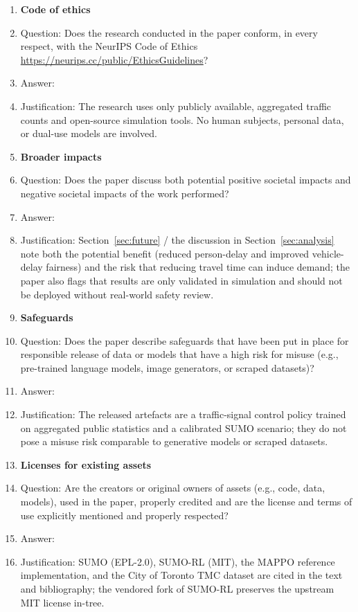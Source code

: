\documentclass{article}
\begin{document}
\begin{enumerate}
\item {\bf Code of ethics}
    \item[] Question: Does the research conducted in the paper conform, in every respect, with the NeurIPS Code of Ethics \url{https://neurips.cc/public/EthicsGuidelines}?
    \item[] Answer: \answerYes{}
    \item[] Justification: The research uses only publicly available, aggregated traffic counts and open-source simulation tools. No human subjects, personal data, or dual-use models are involved.

\item {\bf Broader impacts}
    \item[] Question: Does the paper discuss both potential positive societal impacts and negative societal impacts of the work performed?
    \item[] Answer: \answerYes{}
    \item[] Justification: Section~\ref{sec:future} / the discussion in Section~\ref{sec:analysis} note both the potential benefit (reduced person-delay and improved vehicle-delay fairness) and the risk that reducing travel time can induce demand; the paper also flags that results are only validated in simulation and should not be deployed without real-world safety review.

\item {\bf Safeguards}
    \item[] Question: Does the paper describe safeguards that have been put in place for responsible release of data or models that have a high risk for misuse (e.g., pre-trained language models, image generators, or scraped datasets)?
    \item[] Answer: \answerNA{}
    \item[] Justification: The released artefacts are a traffic-signal control policy trained on aggregated public statistics and a calibrated SUMO scenario; they do not pose a misuse risk comparable to generative models or scraped datasets.

\item {\bf Licenses for existing assets}
    \item[] Question: Are the creators or original owners of assets (e.g., code, data, models), used in the paper, properly credited and are the license and terms of use explicitly mentioned and properly respected?
    \item[] Answer: \answerYes{}
    \item[] Justification: SUMO (EPL-2.0), SUMO-RL (MIT), the MAPPO reference implementation, and the City of Toronto TMC dataset are cited in the text and bibliography; the vendored fork of SUMO-RL preserves the upstream MIT license in-tree.


\end{enumerate}
\end{document}

